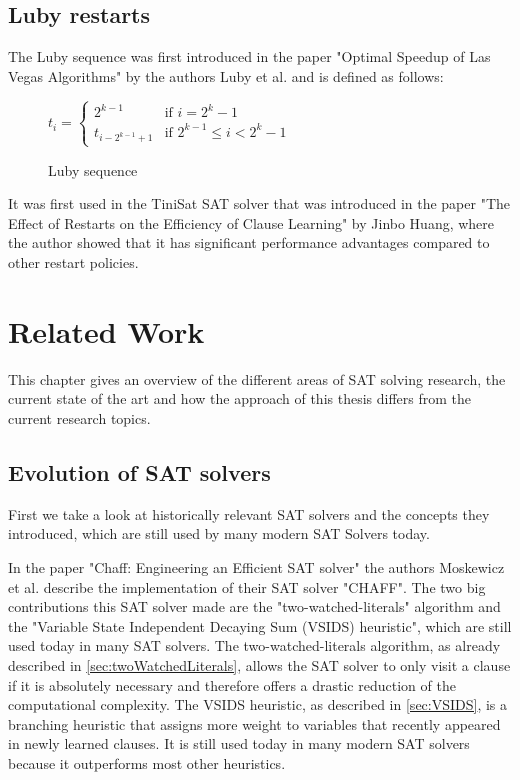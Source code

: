 \section{Luby restarts}

The Luby sequence was first introduced in the paper "Optimal Speedup of Las Vegas Algorithms" \cite{luby1993optimal} by the authors Luby et al. and is defined as follows:

\begin{figure}[h!t]
\centering
\begin{leftbar}
$t_i =
\begin{cases}
  2^{k-1} & \text{if } i = 2^k - 1   \\
  t_{i-2^{k-1}+1} & \text{if } 2^{k-1} \leq i < 2^k - 1
\end{cases}$
\end{leftbar}
\caption{Luby sequence \cite{luby1993optimal}}
\end{figure}

It was first used in the TiniSat SAT solver that was introduced in the paper "The Effect of Restarts on the Efficiency of Clause Learning" \cite{huang2007effect} by Jinbo Huang, where the author showed that it has significant performance advantages compared to other restart policies.

\chapter{Related Work}
\label{ch:Related Work}

This chapter gives an overview of the different areas of SAT solving research, the current state of the art and how the approach of this thesis differs from the current research topics.

\section{Evolution of SAT solvers}
First we take a look at historically relevant SAT solvers and the concepts they introduced, which are still used by many modern SAT Solvers today.

In the paper "Chaff: Engineering an Efficient SAT solver" \cite{moskewicz2001chaff} the authors Moskewicz et al. describe the implementation of their SAT solver "CHAFF". The two big contributions this SAT solver made are the "two-watched-literals" algorithm and the "Variable State Independent Decaying Sum (VSIDS) heuristic", which are still used today in many SAT solvers. The two-watched-literals algorithm, as already described in \ref{sec:twoWatchedLiterals}, allows the SAT solver to only visit a clause if it is absolutely necessary and therefore offers a drastic reduction of the computational complexity. The VSIDS heuristic, as described in \ref{sec:VSIDS}, is a branching heuristic that assigns more weight to variables that recently appeared in newly learned clauses. It is still used today in many modern SAT solvers because it outperforms most other heuristics.

